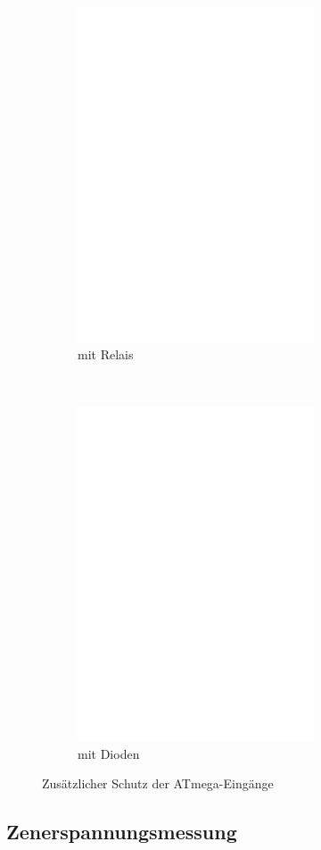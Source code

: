 \begin{figure}[H]
  \begin{subfigure}[b]{9cm}
    \centering
    \includegraphics[width=7cm]{../FIG/relay_addon.eps}
    \caption{mit Relais}
  \end{subfigure}
  ~
  \begin{subfigure}[b]{9cm}
    \centering
    \includegraphics[width=7cm]{../FIG/diode_addon.eps}
    \caption{mit Dioden}
  \end{subfigure}
  \caption{Zusätzlicher Schutz der ATmega-Eingänge}
  \label{fig:relay_addon}
\end{figure}

\subsection{Zenerspannungsmessung}


